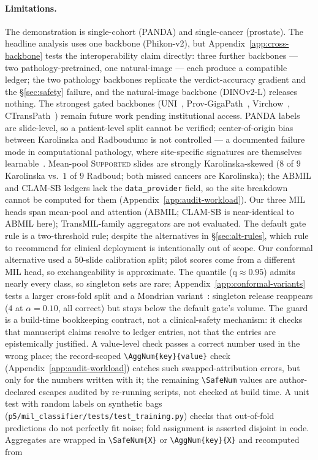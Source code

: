 \documentclass{article}
\newcommand{\SafeNum}[1]{#1}
\begin{document}
\paragraph{Limitations.}
\label{sec:limitations}
The demonstration is single-cohort (PANDA) and single-cancer (prostate). The headline analysis uses one backbone (Phikon-v2), but Appendix~\ref{app:cross-backbone} tests the interoperability claim directly: three further backbones --- two pathology-pretrained, one natural-image --- each produce a compatible ledger; the two pathology backbones replicate the verdict-accuracy gradient and the \S\ref{sec:safety} failure, and the natural-image backbone (DINOv2-L) releases nothing. The strongest gated backbones (UNI~\citep{chen2024uni}, Prov-GigaPath~\citep{xu2024gigapath}, Virchow~\citep{vorontsov2024virchow}, CTransPath~\citep{wang2022ctranspath}) remain future work pending institutional access. PANDA labels are slide-level, so a patient-level split cannot be verified; center-of-origin bias between Karolinska and Radboudumc is not controlled --- a documented failure mode in computational pathology, where site-specific signatures are themselves learnable~\citep{howard2021site}. Mean-pool \textsc{Supported} slides are strongly Karolinska-skewed ($\SafeNum{8}$ of $\SafeNum{9}$ Karolinska vs.\ $\SafeNum{1}$ of $\SafeNum{9}$ Radboud; both missed cancers are Karolinska); the ABMIL and CLAM-SB ledgers lack the \texttt{data\_provider} field, so the site breakdown cannot be computed for them (Appendix~\ref{app:audit-workload}). Our three MIL heads span mean-pool and attention (ABMIL; CLAM-SB is near-identical to ABMIL here); TransMIL-family aggregators are not evaluated. The default gate rule is a two-threshold rule; despite the alternatives in \S\ref{sec:alt-rules}, which rule to recommend for clinical deployment is intentionally out of scope. Our conformal alternative used a $\SafeNum{50}$-slide calibration split; pilot scores come from a different MIL head, so exchangeability is approximate. The quantile (q$\approx\SafeNum{0.95}$) admits nearly every class, so singleton sets are rare; Appendix~\ref{app:conformal-variants} tests a larger cross-fold split and a Mondrian variant~\citep{sadinle2019least,vovk2005algorithmic}: singleton release reappears ($\SafeNum{4}$ at $\alpha{=}\SafeNum{0.10}$, all correct) but stays below the default gate's volume. The guard is a build-time bookkeeping contract, not a clinical-safety mechanism: it checks that manuscript claims resolve to ledger entries, not that the entries are epistemically justified. A value-level check passes a correct number used in the wrong place; the record-scoped \texttt{\textbackslash AggNum\{key\}\{value\}} check (Appendix~\ref{app:audit-workload}) catches such swapped-attribution errors, but only for the numbers written with it; the remaining \texttt{\textbackslash SafeNum} values are author-declared escapes audited by re-running scripts, not checked at build time. A unit test with random labels on synthetic bags (\texttt{p5/mil\_classifier/tests/test\_training.py}) checks that out-of-fold predictions do not perfectly fit noise; fold assignment is asserted disjoint in code. Aggregates are wrapped in \texttt{\textbackslash SafeNum\{X\}} or \texttt{\textbackslash AggNum\{key\}\{X\}} and recomputed from 
\end{document}
